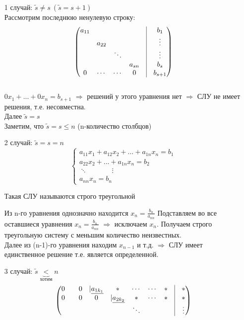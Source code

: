 \documentclass[a4paper, 12pt]{article}
\theoremstyle{definition}
\begin{document}
  \begin{itemize}
    \item[1 случай:]
    $\widetilde{s} \neq s \ (\widetilde{s}=s+1)$ \\ 
    Рассмотрим последнюю ненулевую строку:
    $$\begin{pmatrix}
      a_{11} & \null & \null & \null & \vline & b_1 \\
      \null & a_{22} & \null & \null & \vline & \vdots \\
      \null & \null & \ddots & \null & \vline & \vdots \\
      \null & \null & \null & a_{sn} & \vline & b_s \\
      0 & \cdots & \cdots & 0 & \vline & b_{s+1}
    \end{pmatrix}$$ \\
    $0x_1+...+0x_n=b_{s+1}$ 
    $\Longrightarrow$ решений у этого уравнения нет 
    $\Longrightarrow$ СЛУ не имеет решения, т.е. несовместна. \\
    Далее $\widetilde{s}=s$\\
    Заметим, что $\widetilde{s}=s\leq n$ (n-количество столбцов)
    \item[2 случай:] $\widetilde{s}=s=n$  
    $$\left\{ \begin{aligned}
      a_{11} x_1 + a_{12} x_2+ \dots + a_{1n} x_n = b_1 \\
      a_{22} x_2 + \dots + a_{1n} x_n = b_2 \\ 
      \ddots \ \ \ \ \ \ \ \ \ \ \ \ \ \ \ \ \vdots \ \\
      a_{nn} x_n = b_n
    \end{aligned}
    \right.$$

    Такая СЛУ называются строго треугольной

    Из n-го уравнения однозначно находится $x_n = \frac{b_n}{a_{nn}}$
    Подставляем во все оставшиеся уравнения $x_n = \frac{b_n}{a_{nn}}$ $\Longrightarrow$ исключаем $x_n$. Получаем строго треугольную систему с меньшим количество неизвестных.  \\
    Далее из (n-1)-го уравнения  находим $x_{n-1}$ и т.д. $\Longrightarrow$ СЛУ имеет единственное решение т.е. является определенной.

    \item[3 случай:] $\widetilde{s}\underbrace{<}_{\text{хотим}} n$ 
  $$\begin{pmatrix}
    0 & \null & 0 & |\underline{a_{1k_1}} & \ast & \cdots & \cdots & \ast & \vline & \ast  \\
    0 & \null & 0 & 0 & |\underline{a_{2k_2}} & \ast & \cdots & \ast & \vline & \ast \\
    \null & \null & \null & \null & \null & \ddots & \null & \null & \vline & \vdots
  \end{pmatrix}$$ 


\end{itemize}
\end{document}
